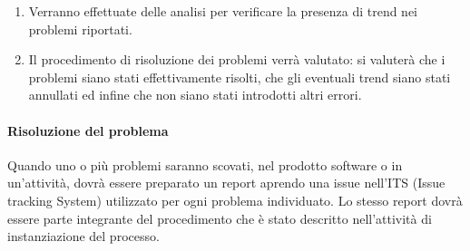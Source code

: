 \begin{enumerate}
				\item Verranno effettuate delle analisi per verificare la presenza di trend nei problemi riportati.

				\item Il procedimento di risoluzione dei problemi verrà valutato: si valuterà che i problemi siano stati effettivamente risolti, che gli eventuali trend siano stati annullati ed infine che non siano stati introdotti altri errori.
			\end{enumerate}	
		\paragraph{Risoluzione del problema}
			Quando uno o più problemi saranno scovati, nel prodotto software o in un'attività, dovrà essere preparato un report aprendo una issue nell'ITS (Issue tracking System) utilizzato per ogni problema individuato. Lo stesso report dovrà essere parte integrante del procedimento che è stato descritto nell'attività di instanziazione del processo.
